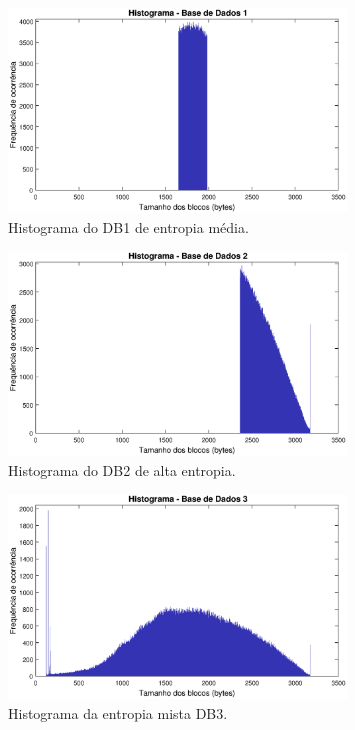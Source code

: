 \begin{figure}
\centering
\includegraphics[width=0.80\textwidth]{figuras/hist1.eps}
\caption{Histograma do DB1 de entropia média.}
\label{fig:database1}
\end{figure}

\begin{figure}
\centering
\includegraphics[width=0.8\textwidth]{figuras/hist2.eps}
\caption{Histograma do DB2 de alta entropia.}
\label{fig:database2}
\end{figure}

\begin{figure}
\centering
\includegraphics[width=0.80\textwidth]{figuras/hist3.eps}
\caption{Histograma da entropia mista DB3.}
\label{fig:database3}
\end{figure}

